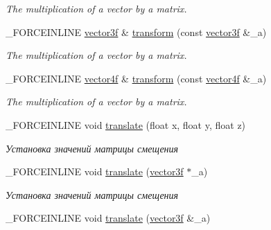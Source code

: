 \begin{DoxyCompactItemize}
\begin{DoxyCompactList}\small\item\em The multiplication of a vector by a matrix. \end{DoxyCompactList}\item 
\hypertarget{classbt_1_1matrix4f_a10f69762d692566de2ac8a496997952b}{\-\_\-\-F\-O\-R\-C\-E\-I\-N\-L\-I\-N\-E \hyperlink{classbt_1_1vector3f}{vector3f} \& \hyperlink{classbt_1_1matrix4f_a10f69762d692566de2ac8a496997952b}{transform} (const \hyperlink{classbt_1_1vector3f}{vector3f} \&\-\_\-a)}\label{classbt_1_1matrix4f_a10f69762d692566de2ac8a496997952b}

\begin{DoxyCompactList}\small\item\em The multiplication of a vector by a matrix. \end{DoxyCompactList}\item 
\hypertarget{classbt_1_1matrix4f_a0820823405b9f97776bcdc8e8cfbd6c8}{\-\_\-\-F\-O\-R\-C\-E\-I\-N\-L\-I\-N\-E \hyperlink{classbt_1_1vector4f}{vector4f} \& \hyperlink{classbt_1_1matrix4f_a0820823405b9f97776bcdc8e8cfbd6c8}{transform} (const \hyperlink{classbt_1_1vector4f}{vector4f} \&\-\_\-a)}\label{classbt_1_1matrix4f_a0820823405b9f97776bcdc8e8cfbd6c8}

\begin{DoxyCompactList}\small\item\em The multiplication of a vector by a matrix. \end{DoxyCompactList}\item 
\hypertarget{classbt_1_1matrix4f_a58e533e2559addd15214ca91a4b67982}{\-\_\-\-F\-O\-R\-C\-E\-I\-N\-L\-I\-N\-E void \hyperlink{classbt_1_1matrix4f_a58e533e2559addd15214ca91a4b67982}{translate} (float x, float y, float z)}\label{classbt_1_1matrix4f_a58e533e2559addd15214ca91a4b67982}

\begin{DoxyCompactList}\small\item\em Установка значений матрицы смещения \end{DoxyCompactList}\item 
\hypertarget{classbt_1_1matrix4f_a01f0e848a356e1842a8032262566a4eb}{\-\_\-\-F\-O\-R\-C\-E\-I\-N\-L\-I\-N\-E void \hyperlink{classbt_1_1matrix4f_a01f0e848a356e1842a8032262566a4eb}{translate} (\hyperlink{classbt_1_1vector3f}{vector3f} $\ast$\-\_\-a)}\label{classbt_1_1matrix4f_a01f0e848a356e1842a8032262566a4eb}

\begin{DoxyCompactList}\small\item\em Установка значений матрицы смещения \end{DoxyCompactList}\item 
\hypertarget{classbt_1_1matrix4f_a4afa001c741f06854191ddce06bb394b}{\-\_\-\-F\-O\-R\-C\-E\-I\-N\-L\-I\-N\-E void \hyperlink{classbt_1_1matrix4f_a4afa001c741f06854191ddce06bb394b}{translate} (\hyperlink{classbt_1_1vector3f}{vector3f} \&\-\_\-a)}\label{classbt_1_1matrix4f_a4afa001c741f06854191ddce06bb394b}


\end{DoxyCompactItemize}
